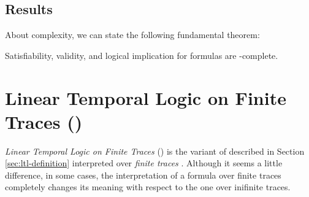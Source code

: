 \subsection{Results}
About \LTL complexity, we can state the following fundamental theorem:
\begin{theorem}\citep{Sistla:1985:CPL:3828.3837}
Satisfiability, validity, and logical implication for \LTL formulas are \PSPACE-complete.
\end{theorem}
\section{Linear Temporal Logic on Finite Traces (\LTLf)}
\textit{Linear Temporal Logic on Finite Traces} (\LTLf) is the variant of \LTL described in Section \ref{sec:ltl-definition} interpreted over \textit{finite traces} \citep{de2013linear}. Although it seems a little difference, in some cases, the interpretation of a formula over finite traces completely changes its meaning with respect to the one over inifinite traces.
